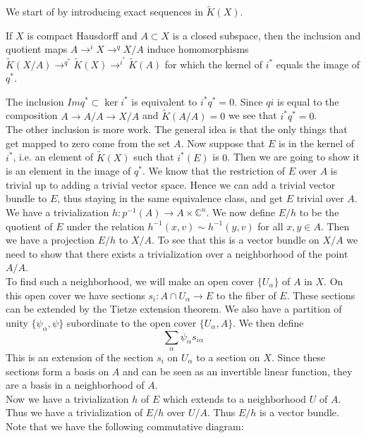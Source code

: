 \documentclass[../Thesis.tex]{subfiles}
\begin{document}
We start of by introducing exact sequences in $\tilde{K}(X)$.
\begin{prop}
If $X$ is compact Hausdorff and $A \subset X$ is a closed subspace, then the inclusion and quotient maps $A \rightarrow^i X \rightarrow^q X / A$ induce homomorphisms $\tilde{K}(X/A) \rightarrow ^{q^*} \tilde{K}(X) \rightarrow^{i^*} \tilde{K}(A)$ for which the kernel of $i^*$ equals the image of $q^*$. 
\end{prop}
\begin{myproof}
The inclusion $Im q^* \subset \ker i^*$ is equivalent to $i^* q^* = 0$. Since $qi$ is equal to the composition $A \rightarrow A/A \rightarrow X/A$ and $\tilde{K}(A/A) = 0$ we see that $i^* q^* = 0$.
\\The other inclusion is more work. The general idea is that the only things that get mapped to zero come from the set $A$.
Now suppose that $E$ is in the kernel of $i^*$, i.e. an element of $\tilde{K}(X)$ such that $i^*(E)$ is $0$. Then we are going to show it is an element in the image of $q^*$. We know that the restriction of $E$ over $A$ is trivial up to adding a trivial vector space. Hence we can add a trivial vector bundle to $E$, thus staying in the same equivalence class, and get $E$ trivial over $A$. We have a trivialization $h : p^{-1}(A) \rightarrow A \times \mathbb{C}^n$. We now define $E/h$ to be the quotient of $E$ under the relation $h^{-1}(x,v) \sim h^{-1}(y,v)$ for all $x,y \in A$. Then we have a projection $E/h$ to $X/A$. To see that this is a vector bundle on $X/A$ we need to show that there exists a trivialization over a neighborhood of the point $A/A$.
\\To find such a neighborhood, we will make an open cover $\{U_\alpha\}$ of $A$ in $X$. On this open cover we have sections $s_i : A \cap U_\alpha \rightarrow E$ to the fiber of $E$. These sections can be extended by the Tietze extension theorem. We also have a partition of unity $\{ \psi_\alpha, \psi\}$ subordinate to the open cover $\{U_\alpha, A\}$. We then define 
\begin{equation}
\sum_\alpha \psi_\alpha s_{i\alpha}
\end{equation}
This is an extension of the section $s_i$ on $U_\alpha$ to a section on $X$. Since these sections form a basis on $A$ and can be seen as an invertible linear function, they are a basis in a neighborhood of $A$. 
\\Now we have a trivialization $h$ of $E$ which extends to a neighborhood $U$ of $A$. Thus we have a trivialization of $E/h$ over $U/A$. Thus $E/h$ is a vector bundle. Note that we have the following commutative diagram:
 \\    


\end{myproof}
\end{document}
